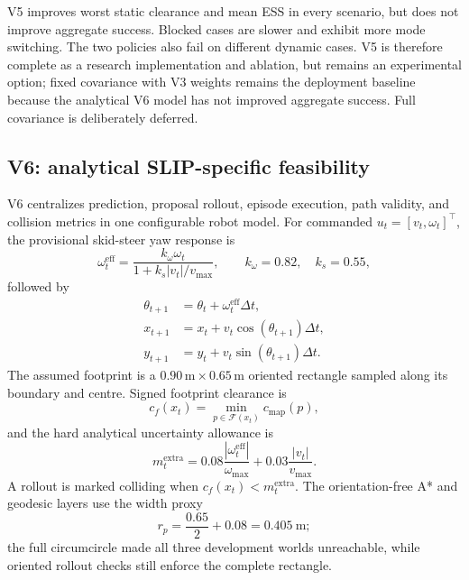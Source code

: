 \documentclass[11pt,a4paper]{article}
\begin{document}
V5 improves worst static clearance and mean ESS in every scenario, but does
not improve aggregate success. Blocked cases are slower and exhibit more mode
switching. The two policies also fail on different dynamic cases. V5 is
therefore complete as a research implementation and ablation, but remains an
experimental option; fixed covariance with V3 weights remains the deployment
baseline because the analytical V6 model has not improved aggregate success.
Full covariance is deliberately deferred.

\subsection{V6: analytical SLIP-specific feasibility}

V6 centralizes prediction, proposal rollout, episode execution, path validity,
and collision metrics in one configurable robot model. For commanded
$u_t=[v_t,\omega_t]^\top$, the provisional skid-steer yaw response is
\begin{equation}
  \omega_t^{\mathrm{eff}}=
  \frac{k_\omega\omega_t}
       {1+k_s|v_t|/v_{\max}},
  \qquad k_\omega=0.82,\quad k_s=0.55,
\end{equation}
followed by
\begin{align}
  \theta_{t+1}&=\theta_t+\omega_t^{\mathrm{eff}}\Delta t,\\
  x_{t+1}&=x_t+v_t\cos(\theta_{t+1})\Delta t,\\
  y_{t+1}&=y_t+v_t\sin(\theta_{t+1})\Delta t.
\end{align}
The assumed footprint is a $0.90\,\mathrm{m}\times0.65\,\mathrm{m}$ oriented
rectangle sampled along its boundary and centre. Signed footprint clearance is
\begin{equation}
  c_f(x_t)=\min_{p\in\mathcal F(x_t)}c_{\mathrm{map}}(p),
\end{equation}
and the hard analytical uncertainty allowance is
\begin{equation}
  m_t^{\mathrm{extra}}=
  0.08\frac{|\omega_t^{\mathrm{eff}}|}{\omega_{\max}}
  +0.03\frac{|v_t|}{v_{\max}}.
\end{equation}
A rollout is marked colliding when $c_f(x_t)<m_t^{\mathrm{extra}}$. The
orientation-free A* and geodesic layers use the width proxy
\begin{equation}
  r_p=\frac{0.65}{2}+0.08=0.405\ \mathrm{m};
\end{equation}
the full circumcircle made all three development worlds unreachable, while
oriented rollout checks still enforce the complete rectangle.
\end{document}
